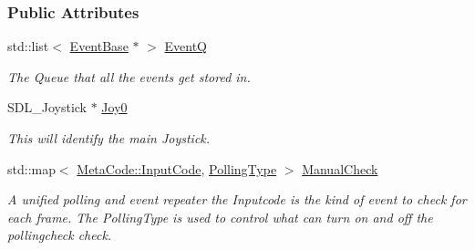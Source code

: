 \subsubsection*{Public Attributes}
\begin{DoxyCompactItemize}
\item 
\hypertarget{structphys_1_1internal_1_1EventManagerInternalData_a2a3389f3831cae8ded6dd0a3b6395a68}{
std::list$<$ \hyperlink{classphys_1_1EventBase}{EventBase} $\ast$ $>$ \hyperlink{structphys_1_1internal_1_1EventManagerInternalData_a2a3389f3831cae8ded6dd0a3b6395a68}{EventQ}}
\label{structphys_1_1internal_1_1EventManagerInternalData_a2a3389f3831cae8ded6dd0a3b6395a68}

\begin{DoxyCompactList}\small\item\em The Queue that all the events get stored in. \item\end{DoxyCompactList}\item 
\hypertarget{structphys_1_1internal_1_1EventManagerInternalData_aafd32b9b23cb2121bd268e3c56a3f46e}{
SDL\_\-Joystick $\ast$ \hyperlink{structphys_1_1internal_1_1EventManagerInternalData_aafd32b9b23cb2121bd268e3c56a3f46e}{Joy0}}
\label{structphys_1_1internal_1_1EventManagerInternalData_aafd32b9b23cb2121bd268e3c56a3f46e}

\begin{DoxyCompactList}\small\item\em This will identify the main Joystick. \item\end{DoxyCompactList}\item 
\hypertarget{structphys_1_1internal_1_1EventManagerInternalData_a717396b1782d7f491e0f085643507639}{
std::map$<$ \hyperlink{classphys_1_1MetaCode_a3e501cbb5bf0f6f1fdb7211465bda8d8}{MetaCode::InputCode}, \hyperlink{structphys_1_1internal_1_1EventManagerInternalData_ab9ab8380b84448aacf46a63050e159af}{PollingType} $>$ \hyperlink{structphys_1_1internal_1_1EventManagerInternalData_a717396b1782d7f491e0f085643507639}{ManualCheck}}
\label{structphys_1_1internal_1_1EventManagerInternalData_a717396b1782d7f491e0f085643507639}

\begin{DoxyCompactList}\small\item\em A unified polling and event repeater the Inputcode is the kind of event to check for each frame. The PollingType is used to control what can turn on and off the pollingcheck check. \item\end{DoxyCompactList}\end{DoxyCompactItemize}


